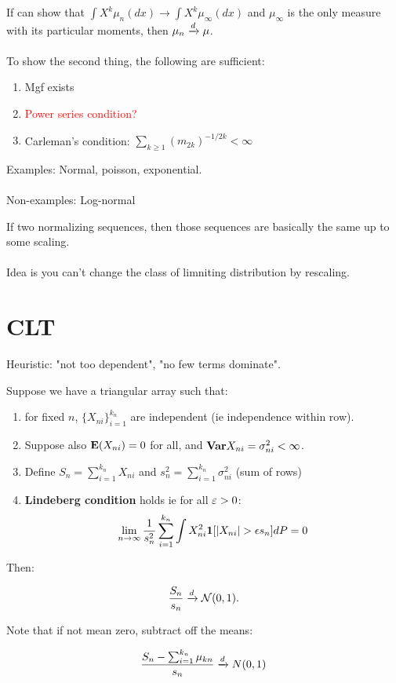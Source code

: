 \documentclass{article}
\newcommand\myworries[1]{\textcolor{red}{#1}}
\begin{document}
\begin{theorem}
If can show that $\int X^k \mu_n (dx) \to \int X^k \mu_\infty (dx)$ and $\mu_\infty$ is the only measure with its particular moments, then $\mu_n\xrightarrow{d} \mu$. \\\\
To show the second thing, the following are sufficient:
\begin{enumerate}
	\item Mgf exists
	\item \myworries{Power series condition?}
	\item Carleman's condition: $\sum_{k\geq 1} (m_{2k})^{-1/2k} <\infty$
\end{enumerate}


\begin{example}
Examples: Normal, poisson, exponential. \\ \\

Non-examples: Log-normal
\end{example}
\end{theorem}
\begin{theorem}
If two normalizing sequences, then those sequences are basically the same up to some scaling.\\\\
Idea is you can't change the class of limniting distribution by rescaling. 
\end{theorem}

\section{CLT}
Heuristic: "not too dependent", "no few terms dominate". 
\begin{theorem}
Suppose we have a triangular array such that:

\begin{enumerate}
	\item  for fixed $n$, $\{X_{ni}\}_{i=1}^{k_n}$ are independent (ie independence within row). 
	\item Suppose also $\mathbf{E} (X_{ni}) = 0$ for all, and $\mathbf{Var} X_{ni} = \sigma^2_{ni} <\infty$.
	\item Define $S_n = \sum_{i=1}^{k_n} X_{ni}$ and $s_n^2 = \sum_{i=1}^{k_n} \sigma^2_{ni}$ (sum of rows)
	\item \textbf{Lindeberg condition} holds ie for all $\varepsilon>0$:
	$$\lim_{n\to \infty} \frac{1}{s_n^2} \sum_{i=1}^{k_n} \int X_{ni}^2 \boldsymbol{1}[ |X_{ni} | >\epsilon s_n ] dP = 0$$
\end{enumerate}  

Then:

$$\frac{S_n}{s_n} \xrightarrow{d} \mathcal N(0,1).$$

Note that if not mean zero, subtract off the means:

$$\frac{S_n - \sum_{i=1}^{k_n} \mu_{kn}}{s_n} \xrightarrow{d} N(0,1)$$

\end{theorem}
\end{document}
